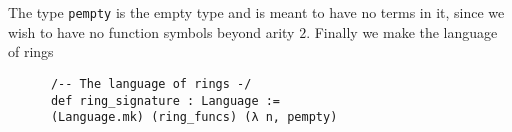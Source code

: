 \begin{dfn}
    The type \texttt{pempty} is the empty type and is meant to have no terms in it,
    since we wish to have no function symbols beyond arity $2$.
    Finally we make the language of rings

    \begin{lstlisting}
      /-- The language of rings -/
      def ring_signature : Language :=
      (Language.mk) (ring_funcs) (λ n, pempty)\end{lstlisting}



\end{dfn}








